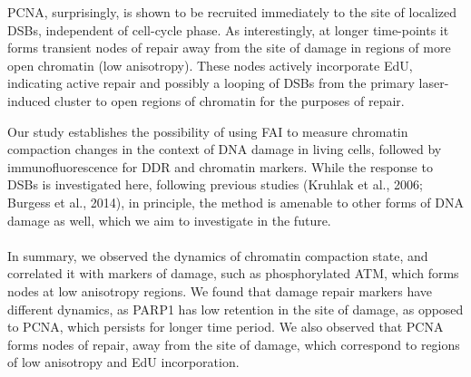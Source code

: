 PCNA, surprisingly, is shown to be recruited immediately to the site of localized DSBs, independent of cell-cycle phase. As interestingly, at longer time-points it forms transient nodes of repair away from the site of damage in regions of more open chromatin (low anisotropy). These nodes actively incorporate EdU, indicating active repair and possibly a looping of DSBs from the primary laser-induced cluster to open regions of chromatin for the purposes of repair.

Our study establishes the possibility of using FAI to measure chromatin compaction changes in the context of DNA damage in living cells, followed by immunofluorescence for DDR and chromatin markers. While the response to DSBs is investigated here, following previous studies (Kruhlak et al., 2006; Burgess et al., 2014), in principle, the method is amenable to other forms of DNA damage as well, which we aim to investigate in the future.

\paragraph*{} In summary, we observed the dynamics of chromatin compaction state, and correlated it with markers of damage, such as phosphorylated ATM, which forms nodes at low anisotropy regions. We found that damage repair markers have different dynamics, as PARP1 has low retention in the site of damage, as opposed to PCNA, which persists for longer time period. We also observed that PCNA forms nodes of repair, away from the site of damage, which correspond to regions of low anisotropy and EdU incorporation.





